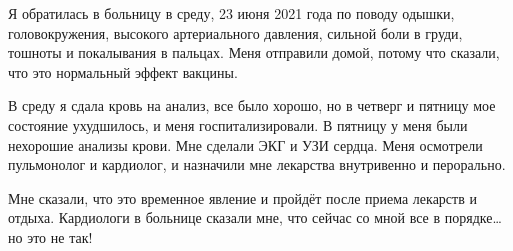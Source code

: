 Я обратилась в больницу в среду, 23 июня 2021 года по поводу одышки,
головокружения, высокого артериального давления, сильной боли в груди, тошноты и
покалывания в пальцах. Меня отправили домой, потому что сказали, что это
нормальный эффект вакцины.

В среду я сдала кровь на анализ, все было хорошо, но в четверг и пятницу мое
состояние ухудшилось, и меня госпитализировали. В пятницу у меня были нехорошие
анализы крови. Мне сделали ЭКГ и УЗИ сердца. Меня осмотрели пульмонолог и
кардиолог, и назначили мне лекарства внутривенно и перорально.

Мне сказали, что это временное явление и пройдёт после приема лекарств и
отдыха. Кардиологи в больнице сказали мне, что сейчас со мной все в порядке… но
это не так!
